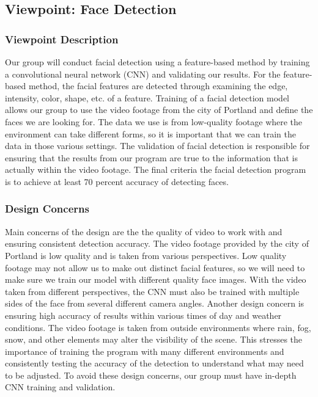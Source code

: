 \subsection{Viewpoint: Face Detection}

\subsubsection{Viewpoint Description} 

Our group will conduct facial detection using a feature-based method by training a convolutional neural network (CNN) and validating our results. For the feature-based method, the facial features are detected through examining the edge, intensity, color, shape, etc. of a feature. Training of a facial detection model allows our group to use the video footage from the city of Portland and define the faces we are looking for. The data we use is from low-quality footage where the environment can take different forms, so it is important that we can train the data in those various settings. The validation of facial detection is responsible for ensuring that the results from our program are true to the information that is actually within the video footage. The final criteria the facial detection program is to achieve at least 70 percent accuracy of detecting faces. 

\subsubsection{Design Concerns} 

Main concerns of the design are the the quality of video to work with and ensuring consistent detection accuracy. The video footage provided by the city of Portland is low quality and is taken from various perspectives. Low quality footage may not allow us to make out distinct facial features, so we will need to make sure we train our model with different quality face images. With the video taken from different perspectives, the CNN must also be trained with multiple sides of the face from several different camera angles. Another design concern is ensuring high accuracy of results within various times of day and weather conditions. The video footage is taken from outside environments where rain, fog, snow, and other elements may alter the visibility of the scene. This stresses the importance of training the program with many different environments and consistently testing the accuracy of the detection to understand what may need to be adjusted. To avoid these design concerns, our group must have in-depth CNN training and validation.

